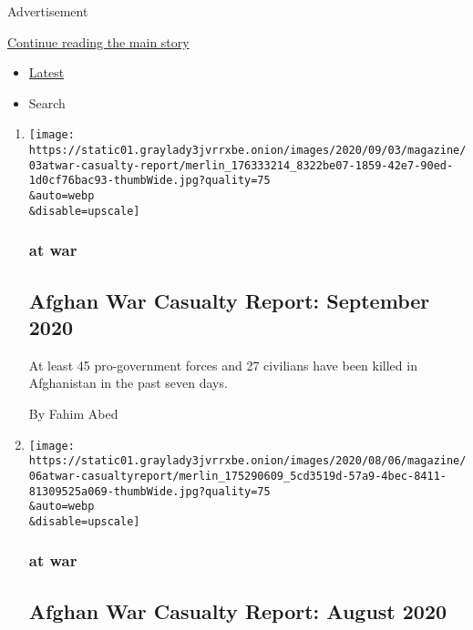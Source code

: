 Advertisement

\protect\hyperlink{after-subheader}{Continue reading the main story}

\begin{itemize}
\tightlist
\item
  \protect\hyperlink{stream-panel}{Latest}
\item
  Search
\end{itemize}

\begin{enumerate}
\def\labelenumi{\arabic{enumi}.}
\item
  \href{/2020/09/03/magazine/afghan-war-casualty-report-september-2020.html}{}

  \texttt{[image: https://static01.graylady3jvrrxbe.onion/images/2020/09/03/magazine/03atwar-casualty-report/merlin\_176333214\_8322be07-1859-42e7-90ed-1d0cf76bac93-thumbWide.jpg?quality=75\\\&auto=webp\\\&disable=upscale]}

  \hypertarget{at-war}{%
  \subsubsection{at war}\label{at-war}}

  \hypertarget{afghan-war-casualty-report-september-2020}{%
  \subsection{Afghan War Casualty Report: September
  2020}\label{afghan-war-casualty-report-september-2020}}

  At least 45 pro-government forces and 27 civilians have been killed in
  Afghanistan in the past seven days.

  By Fahim Abed
\item
  \href{/2020/08/06/magazine/afghan-war-casualty-report-august-2020.html}{}

  \texttt{[image: https://static01.graylady3jvrrxbe.onion/images/2020/08/06/magazine/06atwar-casualtyreport/merlin\_175290609\_5cd3519d-57a9-4bec-8411-81309525a069-thumbWide.jpg?quality=75\\\&auto=webp\\\&disable=upscale]}

  \hypertarget{at-war-1}{%
  \subsubsection{at war}\label{at-war-1}}

  \hypertarget{afghan-war-casualty-report-august-2020}{%
  \subsection{Afghan War Casualty Report: August
  2020}\label{afghan-war-casualty-report-august-2020}}


\end{enumerate}
